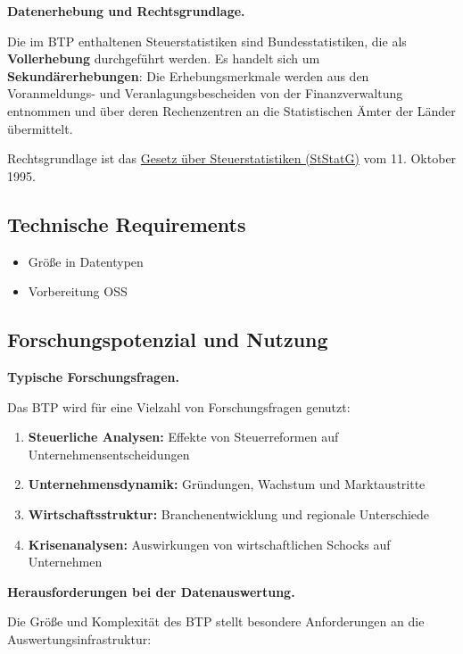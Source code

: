 \documentclass[
  german,
  10pt,
  twoside]{article}
\providecommand{\tightlist}{%
  \setlength{\itemsep}{0pt}\setlength{\parskip}{0pt}}
\begin{document}
\textbf{Datenerhebung und Rechtsgrundlage.}

Die im BTP enthaltenen Steuerstatistiken sind Bundesstatistiken, die als
\textbf{Vollerhebung} durchgeführt werden. Es handelt sich um
\textbf{Sekundärerhebungen}: Die Erhebungsmerkmale werden aus den
Voranmeldungs- und Veranlagungsbescheiden von der Finanzverwaltung
entnommen und über deren Rechenzentren an die Statistischen Ämter der
Länder übermittelt.

Rechtsgrundlage ist das
\href{https://www.gesetze-im-internet.de/ststatg_1995/}{Gesetz über
Steuerstatistiken (StStatG)} vom 11. Oktober 1995.

\subsection{Technische Requirements}\label{technische-requirements}

\begin{itemize}
\tightlist
\item
  Größe in Datentypen
\item
  Vorbereitung OSS
\end{itemize}

\subsection{Forschungspotenzial und
Nutzung}\label{forschungspotenzial-und-nutzung}

\textbf{Typische Forschungsfragen.}

Das BTP wird für eine Vielzahl von Forschungsfragen genutzt:

\begin{enumerate}
\def\labelenumi{\arabic{enumi}.}
\tightlist
\item
  \textbf{Steuerliche Analysen:} Effekte von Steuerreformen auf
  Unternehmensentscheidungen
\item
  \textbf{Unternehmensdynamik:} Gründungen, Wachstum und Marktaustritte
\item
  \textbf{Wirtschaftsstruktur:} Branchenentwicklung und regionale
  Unterschiede
\item
  \textbf{Krisenanalysen:} Auswirkungen von wirtschaftlichen Schocks auf
  Unternehmen
\end{enumerate}

\textbf{Herausforderungen bei der Datenauswertung.}

Die Größe und Komplexität des BTP stellt besondere Anforderungen an die
Auswertungsinfrastruktur:
\end{document}
